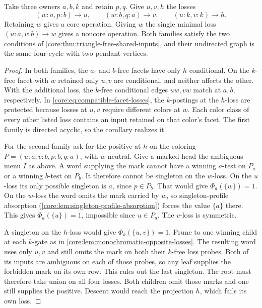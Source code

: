 \begin{proposition}
\label{core:prop:square-facet-obstruction}
Take three owners $a,b,k$ and retain $p,q$. Give $u,v,h$ the losses
\[
  (w:a,p:b)\longrightarrow u,\qquad
  (w:b,q:a)\longrightarrow v,\qquad
  (u:k,v:k)\longrightarrow h .
\]
Retaining $w$ gives a core operation. Giving $w$ the single minimal
loss $(u:a,v:b)\longrightarrow w$ gives a noncore operation.
Both families satisfy the two conditions of
\cref{core:thm:triangle-free-shared-inputs}, and their undirected graph
is the same four-cycle with two pendant vertices.
\end{proposition}
\begin{proof}
In both families, the $a$- and $b$-free facets have only $h$
conditional. On the $k$-free facet with $w$ retained only $u,v$
are conditional, and neither affects the other. With the additional
loss, the $k$-free conditional edges $uw,vw$ match at $a,b$,
respectively. In \eqref{core:eq:compatible-facet-losses}, the
$k$-postings at the $h$-loss are protected because losses at $u,v$
require different colors at $w$. Each color class of every other
listed loss contains an input retained on that color's facet.
The first family is directed acyclic, so the corollary realizes it.

For the second family ask for the positive at $h$ on the coloring
$P=(u:a,v:b,p:b,q:a)$, with $w$ neutral. Give a marked head the
ambiguous menu $I$ as above. A word supplying the mark cannot have
a winning $a$-test on $P_a$ or a winning $b$-test on $P_b$.
It therefore cannot be singleton on the $w$-loss. On the $u$-loss
its only possible singleton is $a$, since $p\in P_b$.
That would give $\Phi_a(\{w\})=1$. On the $w$-loss the word omits
the mark carried by $w$, so singleton-profile absorption
(\cref{core:lem:singleton-profile-absorption}) forces the value
$\{a\}$ there. This gives $\Phi_a(\{u\})=1$, impossible since
$u\in P_a$. The $v$-loss is symmetric.

A singleton on the $h$-loss would give $\Phi_k(\{u,v\})=1$.
Prune to one winning child at each $k$-gate as in
\cref{core:lem:monochromatic-opposite-losses}. The resulting word uses
only $u,v$ and still omits the mark on both their $k$-free loss probes.
Both of its inputs are ambiguous on each of those probes, so any leaf
supplies the forbidden mark on its own row. This rules out the last
singleton. The root must therefore take union on all four losses.
Both children omit those marks and one still supplies the positive.
Descent would reach the projection $h$, which fails its own loss.
\end{proof}

